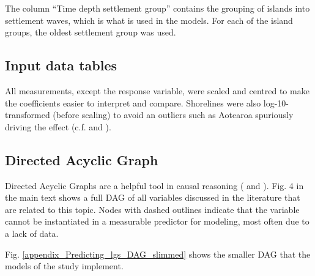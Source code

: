 \documentclass[unnumsec,webpdf,modern,medium]{oup-authoring-template}
\begin{document}
The column ``Time depth settlement group'' contains the grouping of islands into settlement waves, which is what is used in the models. For each of the island groups, the oldest settlement group was used.

\begin{landscape}

\end{landscape}


\FloatBarrier
\newpage

\subsection{Input data tables}
\singlespacing
\label{appendix_data tables}
All measurements, except the response variable, were scaled and centred to make the coefficients easier to interpret and compare. Shorelines were also log-10-transformed (before scaling) to avoid an outliers such as Aotearoa spuriously driving the effect (c.f. \citet{rolett2004environmental} and \citet{atkinson2016cultural}).

\begin{landscape}



\end{landscape}
\newpage

\subsection{Directed Acyclic Graph}
\label{appendix_DAG_def}
Directed Acyclic Graphs are a helpful tool in causal reasoning (\citet{pearl1995causal} and \citet{mcelreath2020statistical}). Fig. 4 in the main text shows a full DAG of all variables discussed in the literature that are related to this topic. Nodes with dashed outlines indicate that the variable cannot be instantiated in a measurable predictor for modeling, most often due to a lack of data. 

Fig. \ref{appendix_Predicting_lgs_DAG_slimmed} shows the smaller DAG that the models of the study implement. 
\end{document}
